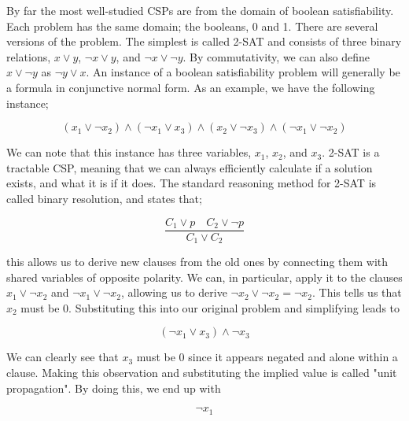 By far the most well-studied CSPs are from the domain of boolean satisfiability. Each problem has the same domain; the booleans, 0 and 1. There are several versions of the problem. The simplest is called 2-SAT and consists of three binary relations, $x \vee y$, $\neg x \vee y$, and $\neg x \vee \neg y$. By commutativity, we can also define $x \vee \neg y$ as $\neg y \vee x$. An instance of a boolean satisfiability problem will generally be a formula in conjunctive normal form. As an example, we have the following instance;

\begin{equation}\label{equation:two-sat-example-pt1}
    (x_1 \lor \neg x_2) \land (\neg x_1 \lor x_3) \land (x_2 \lor \neg x_3) \land (\neg x_1 \lor \neg x_2)
\end{equation}

We can note that this instance has three variables, $x_1$, $x_2$, and $x_3$. 2-SAT is a tractable CSP, meaning that we can always efficiently calculate if a solution exists, and what it is if it does. The standard reasoning method for 2-SAT is called binary resolution, and states that;

\begin{equation}\label{equation:binary-resolution}
\frac{C_1 \lor p \quad C_2 \lor \neg p}{C_1 \lor C_2}
\end{equation}

this allows us to derive new clauses from the old ones by connecting them with shared variables of opposite polarity. We can, in particular, apply it to the clauses $x_1 \lor \neg x_2$ and $\neg x_1 \lor \neg x_2$, allowing us to derive $\neg x_2 \lor \neg x_2 = \neg x_2$. This tells us that $x_2$ must be $0$. Substituting this into our original problem and simplifying leads to

\begin{equation}\label{equation:two-sat-example-pt2}
(\neg x_1 \lor x_3) \land \neg x_3
\end{equation}

We can clearly see that $x_3$ must be $0$ since it appears negated and alone within a clause. Making this observation and substituting the implied value is called "unit propagation".
By doing this, we end up with

\begin{equation}\label{equation:two-sat-example-pt3}
\neg x_1
\end{equation}

